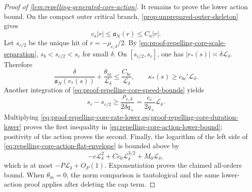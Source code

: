 \begin{proof}[Proof of \cref{lem:repelling-generated-core-action}]
It remains to prove the lower action bound.  On the compact outer
critical branch, \cref{prop:unprepared-outer-skeleton} gives
\begin{equation}
 c_a|r|\le\mathfrak a_N(r)\le C_a|r|.           \label{eq:proof-repelling-core-a-comparison}
\end{equation}
Let \(s_{c/2}\) be the unique hit of
\(r=-\rho_{c,\delta}/2\).  By
\cref{eq:proof-repelling-core-scale-separation},
\(s_b<s_{c/2}<s_c\) for small \(\delta\).  On
\([s_{c/2},s_c]\), one has
\(|r_*(s)|\asymp\delta\mathscr L_\delta\).  Therefore
\begin{equation}
 \frac{\delta}{\mathfrak a_N(r_*(s))}
       +\frac{\theta_m}{\mathscr L_\delta}
 \le\frac{C_{bc}}{\mathscr L_\delta},
 \qquad
 \kappa_*(s)\ge c_{bc}'\mathscr L_\delta.       \label{eq:proof-repelling-core-rate-lower}
\end{equation}
Another integration of
\cref{eq:proof-repelling-core-speed-bounds} yields
\begin{equation}
 s_c-s_{c/2}
 \ge\frac{\rho_{c,\delta}}
          {2\delta q_+}
 =\frac{c_c}{2q_+}\mathscr L_\delta.           \label{eq:proof-repelling-core-duration-lower}
\end{equation}
Multiplying
\cref{eq:proof-repelling-core-rate-lower,eq:proof-repelling-core-duration-lower}
proves the first inequality in
\cref{eq:repelling-core-action-lower-bound}; positivity of the action
proves the second.  Finally, the logarithm of the left side of
\cref{eq:repelling-core-action-flat-envelope} is bounded above by
\begin{equation}
 -c\mathscr L_\delta^2+C c_0\mathscr L_\delta^{3/2}
       +M_0\mathscr L_\delta,
                                                        \label{eq:proof-repelling-core-flat-log}
\end{equation}
which is at most \(-P\mathscr L_\delta+O_P(1)\).  Exponentiation proves
the claimed all-orders
bound.  When \(\theta_m=0\), the norm comparison is tautological and the
same lower-action proof applies after deleting the cap term.
\end{proof}

